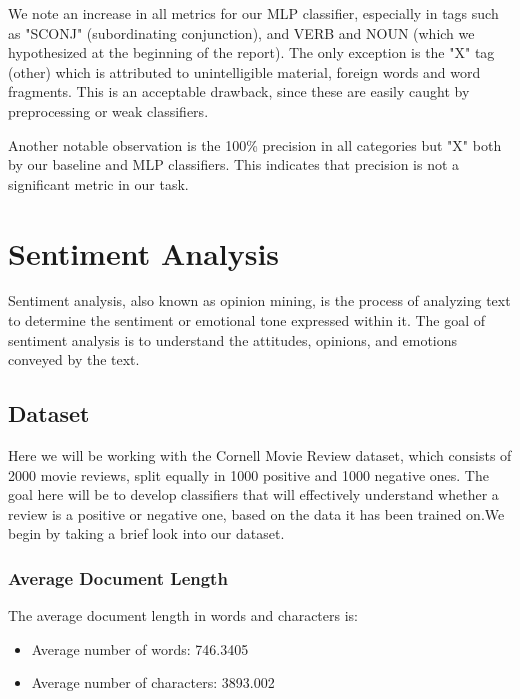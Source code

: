 \documentclass[10pt, a4paper]{article}
\begin{document}
	We note an increase in all metrics for our MLP classifier, especially in tags such as "SCONJ" (subordinating conjunction), and VERB and NOUN (which we hypothesized at the beginning of the report). The only exception is the "X" tag (other) which is attributed to unintelligible material, foreign words and word fragments. This is an acceptable drawback, since these are easily caught by preprocessing or weak classifiers.
	
	Another notable observation is the 100\% precision in all categories but "X" both by our baseline and MLP classifiers. This indicates that precision is not a significant metric in our task.

	
	
	
	
	



     \section{Sentiment Analysis}
        
    Sentiment analysis, also known as opinion mining, is the process of analyzing text to determine the sentiment or emotional tone expressed within it. The goal of sentiment analysis is to understand the attitudes, opinions, and emotions conveyed by the text. 

    \subsection{Dataset}
    Here we will be working with the Cornell Movie Review dataset, which consists of 2000 movie reviews, split equally in 1000 positive and 1000 negative ones. The goal here will be to develop classifiers that will effectively understand whether a review is a positive or negative one, based on the data it has been trained on.We begin by taking a brief look into our dataset.
    
    
    \subsubsection{Average Document Length }

    The average document length in words and characters is:
    \begin{itemize}
        \item Average number of words: 746.3405
        \item Average number of characters: 3893.002
    \end{itemize}
\end{document}
